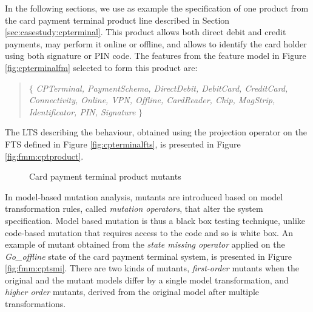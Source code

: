 In the following sections, we use as example the specification of one product from the card payment terminal product line described in Section \ref{sec:casestudy:cpterminal}. This product allows both direct debit and credit payments, may perform it online or offline, and allows to identify the card holder using both signature or PIN code. The features from the feature model in Figure \ref{fig:cpterminalfm} selected to form this product are: 
\begin{quote}
$\lbrace$ \textit{CPTerminal, PaymentSchema, DirectDebit, DebitCard, CreditCard, Connectivity, Online, VPN, Offline, CardReader, Chip, MagStrip, Identificator, PIN, Signature} $\rbrace$
\end{quote}
The \gls{LTS} describing the behaviour, obtained using the projection operator on the FTS defined in Figure \ref{fig:cpterminalfts}, is presented in Figure \ref{fig:fmm:cptproduct}.

\begin{figure}[t]
	\centering
	\caption{Card payment terminal product mutants}
	\label{fig:fmm:cptmutants}
\end{figure}

In model-based mutation analysis, mutants are introduced based on model transformation rules, called \emph{mutation operators}, that alter the system specification. Model based mutation is thus a black box testing technique, unlike code-based mutation that requires access to the code and so is white box. An example of mutant obtained from the \textit{state missing operator} applied on the \textit{Go\_offline} state of the card payment terminal system, is presented in Figure \ref{fig:fmm:cptsmi}. There are two kinds of mutants, \textit{first-order} mutants when the original and the mutant models differ by a single model transformation, and \textit{higher order} mutants, derived from the original model after multiple transformations.  


